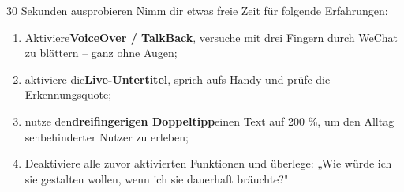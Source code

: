 \begin{tcbpractice}{30 Sekunden ausprobieren}
Nimm dir etwas freie Zeit für folgende Erfahrungen:

\begin{enumerate}
  \item Aktiviere\textbf{VoiceOver / TalkBack}, versuche mit drei Fingern durch WeChat zu blättern – ganz ohne Augen;
  \item aktiviere die\textbf{Live-Untertitel}, sprich aufs Handy und prüfe die Erkennungsquote;
  \item nutze den\textbf{dreifingerigen Doppeltipp}einen Text auf 200 \%, um den Alltag sehbehinderter Nutzer zu erleben;
  \item Deaktiviere alle zuvor aktivierten Funktionen und überlege: „Wie würde ich sie gestalten wollen, wenn ich sie dauerhaft bräuchte?"
\end{enumerate}

\end{tcbpractice}
